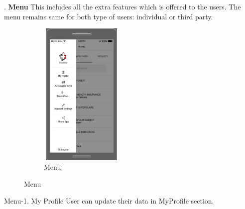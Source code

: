 .
\newline\newline\newline\newline\newline\newline\newline\newline
\textbf{Menu}
\newline
This includes all the extra features which is offered to the users. The menu remains same for both type of users: individual or third party.

\begin{figure}[H]
	\centering
	\begin{subfigure}[b]{0.4\textwidth}	
		\includegraphics[width=4cm,height=7cm]		{./RASD_Mockups/6_Menu.JPG}
      	\caption{Menu}
        \label{TrackMe_Menu}
	 \end{subfigure}
\end{figure}

Menu-1. My Profile\newline
User can update their data in MyProfile section.

